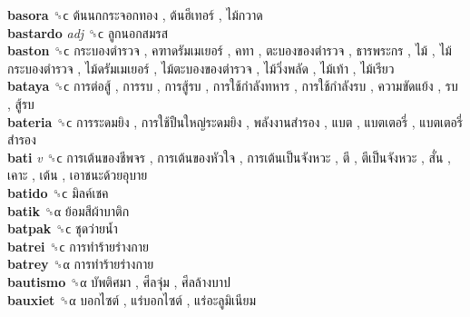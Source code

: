 \textbf{basora} ␝ϲ   ต้นนกกระจอกทอง ,  ต้นฮีเทอร์ ,  ไม้กวาด   \\
\textbf{bastardo} \emph{adj}  ␝ϲ   ลูกนอกสมรส   \\
\textbf{baston} ␝ϲ   กระบองตำรวจ ,  คฑาดรัมเมเยอร์ ,  คทา ,  ตะบองของตำรวจ ,  ธารพระกร ,  ไม้ ,  ไม้กระบองตำรวจ ,  ไม้ดรัมเมเยอร์ ,  ไม้ตะบองของตำรวจ ,  ไม้วิ่งพลัด ,  ไม้เท้า ,  ไม้เรียว   \\
\textbf{bataya} ␝ϲ   การต่อสู้ ,  การรบ ,  การสู้รบ ,  การใช้กำลังทหาร ,  การใช้กำลังรบ ,  ความขัดแย้ง ,  รบ ,  สู้รบ   \\
\textbf{bateria} ␝ϲ   การระดมยิง ,  การใช้ปืนใหญ่ระดมยิง ,  พลังงานสำรอง ,  แบต ,  แบตเตอรี่ ,  แบตเตอรี่สำรอง   \\
\textbf{bati} \emph{v}  ␝ϲ   การเต้นของชีพจร ,  การเต้นของหัวใจ ,  การเต้นเป็นจังหวะ ,  ตี ,  ตีเป็นจังหวะ ,  สั่น ,  เคาะ ,  เต้น ,  เอาชนะด้วยอุบาย   \\
\textbf{batido} ␝ϲ   มิลค์เชค   \\
\textbf{batik} ␝α   ย้อมสีผ้าบาติก   \\
\textbf{batpak} ␝ϲ   ชุดว่ายน้ำ   \\
\textbf{batrei} ␝ϲ   การทำร้ายร่างกาย   \\
\textbf{batrey} ␝α   การทำร้ายร่างกาย   \\
\textbf{bautismo} ␝α   บัพติศมา ,  ศีลจุ่ม ,  ศีลล้างบาป   \\
\textbf{bauxiet} ␝α   บอกไซต์ ,  แร่บอกไซต์ ,  แร่อะลูมิเนียม   \\
